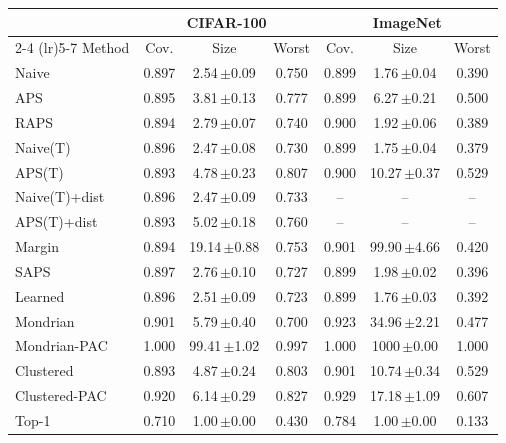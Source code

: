 \begin{tabular}{lcccccc}
\toprule
 & \multicolumn{3}{c}{CIFAR-100} & \multicolumn{3}{c}{ImageNet} \\
\cmidrule(lr){2-4} \cmidrule(lr){5-7}
Method & Cov. & Size & Worst & Cov. & Size & Worst \\
\midrule
Naive & 0.897 & 2.54\,{\scriptsize$\pm$0.09} & 0.750 & 0.899 & 1.76\,{\scriptsize$\pm$0.04} & 0.390 \\
APS & 0.895 & 3.81\,{\scriptsize$\pm$0.13} & 0.777 & 0.899 & 6.27\,{\scriptsize$\pm$0.21} & 0.500 \\
RAPS & 0.894 & 2.79\,{\scriptsize$\pm$0.07} & 0.740 & 0.900 & 1.92\,{\scriptsize$\pm$0.06} & 0.389 \\
Naive(T) & 0.896 & 2.47\,{\scriptsize$\pm$0.08} & 0.730 & 0.899 & 1.75\,{\scriptsize$\pm$0.04} & 0.379 \\
APS(T) & 0.893 & 4.78\,{\scriptsize$\pm$0.23} & 0.807 & 0.900 & 10.27\,{\scriptsize$\pm$0.37} & 0.529 \\
Naive(T)+dist & 0.896 & 2.47\,{\scriptsize$\pm$0.09} & 0.733 & -- & -- & -- \\
APS(T)+dist & 0.893 & 5.02\,{\scriptsize$\pm$0.18} & 0.760 & -- & -- & -- \\
\addlinespace[2pt]
Margin & 0.894 & 19.14\,{\scriptsize$\pm$0.88} & 0.753 & 0.901 & 99.90\,{\scriptsize$\pm$4.66} & 0.420 \\
SAPS & 0.897 & 2.76\,{\scriptsize$\pm$0.10} & 0.727 & 0.899 & 1.98\,{\scriptsize$\pm$0.02} & 0.396 \\
Learned & 0.896 & 2.51\,{\scriptsize$\pm$0.09} & 0.723 & 0.899 & 1.76\,{\scriptsize$\pm$0.03} & 0.392 \\
\addlinespace[2pt]
Mondrian & 0.901 & 5.79\,{\scriptsize$\pm$0.40} & 0.700 & 0.923 & 34.96\,{\scriptsize$\pm$2.21} & 0.477 \\
Mondrian-PAC & 1.000 & 99.41\,{\scriptsize$\pm$1.02} & 0.997 & 1.000 & 1000\,{\scriptsize$\pm$0.00} & 1.000 \\
Clustered & 0.893 & 4.87\,{\scriptsize$\pm$0.24} & 0.803 & 0.901 & 10.74\,{\scriptsize$\pm$0.34} & 0.529 \\
Clustered-PAC & 0.920 & 6.14\,{\scriptsize$\pm$0.29} & 0.827 & 0.929 & 17.18\,{\scriptsize$\pm$1.09} & 0.607 \\
Top-1 & 0.710 & 1.00\,{\scriptsize$\pm$0.00} & 0.430 & 0.784 & 1.00\,{\scriptsize$\pm$0.00} & 0.133 \\
\bottomrule
\end{tabular}
